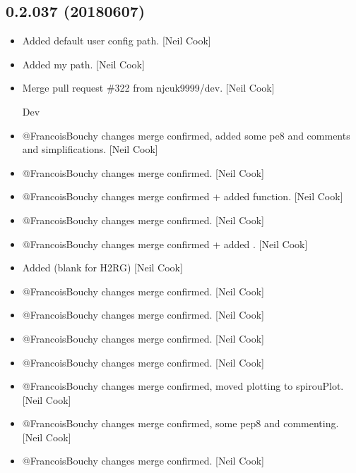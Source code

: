 \documentclass[a4paper,10pt,english]{report}
\begin{document}
\subsection{0.2.037 (2018\sphinxhyphen{}06\sphinxhyphen{}07)}
\label{\detokenize{misc/changelog:id445}}\begin{itemize}
\item {} 
Added default user config path. {[}Neil Cook{]}

\item {} 
Added my path. {[}Neil Cook{]}

\item {} 
Merge pull request \#322 from njcuk9999/dev. {[}Neil Cook{]}

Dev

\item {} 
@FrancoisBouchy changes \sphinxhyphen{} merge confirmed, added some pe8 and comments
and simplifications. {[}Neil Cook{]}

\item {} 
@FrancoisBouchy changes \sphinxhyphen{} merge confirmed. {[}Neil Cook{]}

\item {} 
@FrancoisBouchy changes \sphinxhyphen{} merge confirmed + added 
function. {[}Neil Cook{]}

\item {} 
@FrancoisBouchy changes \sphinxhyphen{} merge confirmed. {[}Neil Cook{]}

\item {} 
@FrancoisBouchy changes \sphinxhyphen{} merge confirmed + added
. {[}Neil Cook{]}

\item {} 
Added  (blank for H2RG) {[}Neil Cook{]}

\item {} 
@FrancoisBouchy changes \sphinxhyphen{} merge confirmed. {[}Neil Cook{]}

\item {} 
@FrancoisBouchy changes \sphinxhyphen{} merge confirmed. {[}Neil Cook{]}

\item {} 
@FrancoisBouchy changes \sphinxhyphen{} merge confirmed. {[}Neil Cook{]}

\item {} 
@FrancoisBouchy changes \sphinxhyphen{} merge confirmed. {[}Neil Cook{]}

\item {} 
@FrancoisBouchy changes \sphinxhyphen{} merge confirmed, moved plotting to
spirouPlot. {[}Neil Cook{]}

\item {} 
@FrancoisBouchy changes \sphinxhyphen{} merge confirmed, some pep8 and commenting.
{[}Neil Cook{]}

\item {} 
@FrancoisBouchy changes \sphinxhyphen{} merge confirmed. {[}Neil Cook{]}

\end{itemize}
\end{document}
